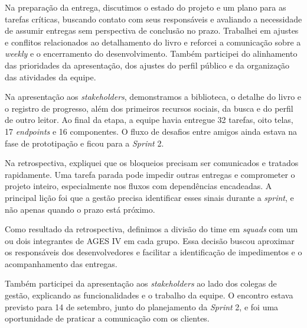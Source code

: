 Na preparação da entrega, discutimos o estado do projeto e um plano para as tarefas críticas, buscando contato com seus responsáveis e avaliando a necessidade de assumir entregas sem perspectiva de conclusão no prazo. Trabalhei em ajustes e conflitos relacionados ao detalhamento do livro e reforcei a comunicação sobre a \textit{weekly} e o encerramento do desenvolvimento. Também participei do alinhamento das prioridades da apresentação, dos ajustes do perfil público e da organização das atividades da equipe.

Na apresentação aos \textit{stakeholders}, demonstramos a biblioteca, o detalhe do livro e o registro de progresso, além dos primeiros recursos sociais, da busca e do perfil de outro leitor. Ao final da etapa, a equipe havia entregue 32 tarefas, oito telas, 17 \textit{endpoints} e 16 componentes. O fluxo de desafios entre amigos ainda estava na fase de prototipação e ficou para a \textit{Sprint} 2.

Na retrospectiva, expliquei que os bloqueios precisam ser comunicados e tratados rapidamente. Uma tarefa parada pode impedir outras entregas e comprometer o projeto inteiro, especialmente nos fluxos com dependências encadeadas. A principal lição foi que a gestão precisa identificar esses sinais durante a \textit{sprint}, e não apenas quando o prazo está próximo.

Como resultado da retrospectiva, definimos a divisão do time em \textit{squads} com um ou dois integrantes de \ac{AGES} IV em cada grupo. Essa decisão buscou aproximar os responsáveis dos desenvolvedores e facilitar a identificação de impedimentos e o acompanhamento das entregas.

Também participei da apresentação aos \textit{stakeholders} ao lado dos colegas de gestão, explicando as funcionalidades e o trabalho da equipe. O encontro estava previsto para 14 de setembro, junto do planejamento da \textit{Sprint} 2, e foi uma oportunidade de praticar a comunicação com os clientes.
